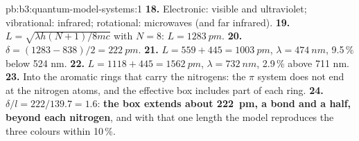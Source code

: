 \begin{solution}{pb:b3:quantum-model-systems:1}
\textbf{18.} Electronic: visible and ultraviolet; vibrational: infrared;
rotational: microwaves (and far infrared).
\textbf{19.} $L = \sqrt{\lambda h(N+1)/8mc}$ with $N = 8$: $L = \qty{1283}{pm}$.
\textbf{20.} $\delta = (1283 - 838)/2 = \qty{222}{pm}$.
\textbf{21.} $L = 559 + 445 = \qty{1003}{pm}$, $\lambda = \qty{474}{nm}$, 9.5\,\%
below 524 nm.
\textbf{22.} $L = 1118 + 445 = \qty{1562}{pm}$, $\lambda = \qty{732}{nm}$, 2.9\,\%
above 711 nm.
\textbf{23.} Into the aromatic rings that carry the nitrogens: the $\pi$
system does not end at the nitrogen atoms, and the effective box includes
part of each ring.
\textbf{24.} $\delta/l = 222/139.7 = 1.6$: \textbf{the box extends about
\qty{222}{pm}, a bond and a half, beyond each nitrogen}, and with that one
length the model reproduces the three colours within 10\,\%.
\end{solution}
